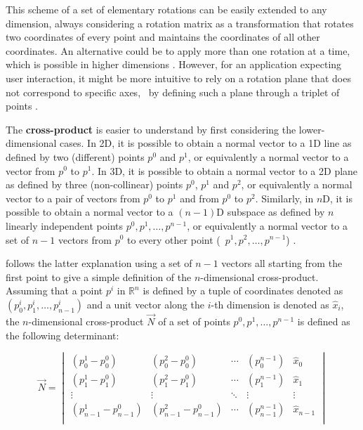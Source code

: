 This scheme of a set of elementary rotations can be easily extended to any dimension, always considering a rotation matrix as a transformation that rotates two coordinates of every point and maintains the coordinates of all other coordinates.
An alternative could be to apply more than one rotation at a time, which is possible in higher dimensions \citep{vanElfrinkhof97}.
However, for an application expecting user interaction, it might be more intuitive to rely on a rotation plane that does not correspond to specific axes, \eg\ by defining such a plane through a triplet of points \citep{Hanson94}.

The \textbf{cross-product} is easier to understand by first considering the lower-dimensional cases.
In 2D, it is possible to obtain a normal vector to a 1D line as defined by two (different) points $p^0$ and $p^1$, or equivalently a normal vector to a vector from $p^0$ to $p^1$.
In 3D, it is possible to obtain a normal vector to a 2D plane as defined by three (non-collinear) points $p^0$, $p^1$ and $p^2$, or equivalently a normal vector to a pair of vectors from $p^0$ to $p^1$ and from $p^0$ to $p^2$.
Similarly, in $n$D, it is possible to obtain a normal vector to a $(n-1)$D subspace as defined by $n$ linearly independent points $p^0, p^1, \ldots, p^{n-1}$, or equivalently a normal vector to a set of $n-1$ vectors from $p^0$ to every other point (\ie\ $p^1, p^2, \ldots, p^{n-1}$) \citep{Massey83,Elduque04}.

\citet{Hanson94} follows the latter explanation using a set of $n-1$ vectors all starting from the first point to give a simple definition of the $n$-dimensional cross-product.
Assuming that a point $p^i$ in $\mathbb{R}^n$ is defined by a tuple of coordinates denoted as $(p^i_0, p^i_1, \ldots, p^i_{n-1})$ and a unit vector along the $i$-th dimension is denoted as $\hat{x}_i$, the $n$-dimensional cross-product $\vec{N}$ of a set of points $p^0, p^1, \ldots, p^{n-1}$ is defined as the following determinant:

\begin{equation*}
\vec{N} = \begin{vmatrix}
(p^1_0 - p^0_0) & (p^2_0 - p^0_0) & \cdots & (p^{n-1}_0) & \hat{x}_0 \\
(p^1_1 - p^0_1) & (p^2_1 - p^0_1) & \cdots & (p^{n-1}_1) & \hat{x}_1 \\
\vdots & \vdots & \ddots & \vdots & \vdots \\
(p^1_{n-1} - p^0_{n-1}) & (p^2_{n-1} - p^0_{n-1}) & \cdots & (p^{n-1}_{n-1}) & \hat{x}_{n-1} \\
\end{vmatrix}
\end{equation*}

